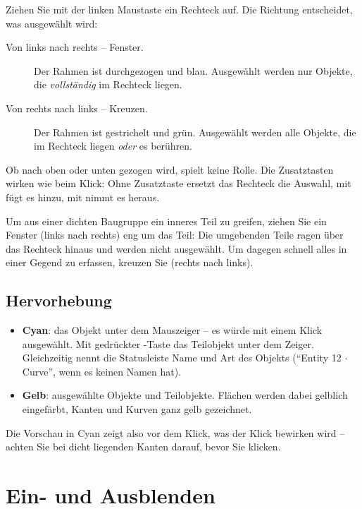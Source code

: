 Ziehen Sie mit der linken Maustaste ein Rechteck auf. Die Richtung entscheidet, was ausgewählt
wird:

\begin{description}
  \item[Von links nach rechts -- Fenster.] Der Rahmen ist durchgezogen und blau. Ausgewählt
    werden nur Objekte, die \emph{vollständig} im Rechteck liegen.
  \item[Von rechts nach links -- Kreuzen.] Der Rahmen ist gestrichelt und grün. Ausgewählt
    werden alle Objekte, die im Rechteck liegen \emph{oder} es berühren.
\end{description}

Ob nach oben oder unten gezogen wird, spielt keine Rolle. Die Zusatztasten wirken wie beim
Klick: Ohne Zusatztaste ersetzt das Rechteck die Auswahl, mit  fügt es hinzu, mit
 nimmt es heraus.

\begin{tipp}
Um aus einer dichten Baugruppe ein inneres Teil zu greifen, ziehen Sie ein Fenster (links
nach rechts) eng um das Teil: Die umgebenden Teile ragen über das Rechteck hinaus und werden
nicht ausgewählt. Um dagegen schnell alles in einer Gegend zu erfassen, kreuzen Sie (rechts
nach links).
\end{tipp}

\subsection{Hervorhebung}\label{sec:hervorhebung}

\begin{itemize}
  \item \textbf{Cyan}: das Objekt unter dem Mauszeiger -- es würde mit einem Klick ausgewählt.
    Mit gedrückter -Taste das Teilobjekt unter dem Zeiger. Gleichzeitig nennt
    die Statusleiste Name und Art des Objekts (\enquote{Entity 12 $\cdot$ Curve}, wenn es keinen
    Namen hat).
  \item \textbf{Gelb}: ausgewählte Objekte und Teilobjekte. Flächen werden dabei gelblich
    eingefärbt, Kanten und Kurven ganz gelb gezeichnet.
\end{itemize}

Die Vorschau in Cyan zeigt also vor dem Klick, was der Klick bewirken wird -- achten Sie bei
dicht liegenden Kanten darauf, bevor Sie klicken.

\section{Ein- und Ausblenden}\label{sec:ausblenden}

